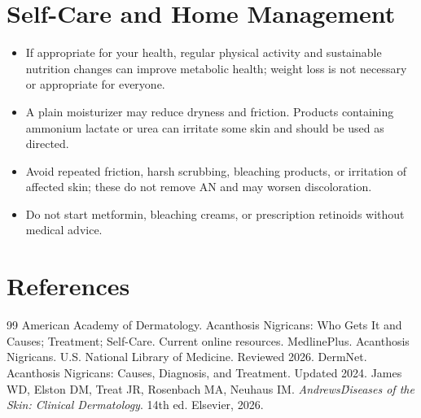 \section*{Self-Care and Home Management}
\begin{itemize}
 \item If appropriate for your health, regular physical activity and sustainable nutrition changes can improve metabolic health; weight loss is not necessary or appropriate for everyone.
 \item A plain moisturizer may reduce dryness and friction. Products containing ammonium lactate or urea can irritate some skin and should be used as directed.
 \item Avoid repeated friction, harsh scrubbing, bleaching products, or irritation of affected skin; these do not remove AN and may worsen discoloration.
 \item Do not start metformin, bleaching creams, or prescription retinoids without medical advice.
\end{itemize}

\section*{References}
\begin{thebibliography}{99}
 American Academy of Dermatology. Acanthosis Nigricans: Who Gets It and Causes; Treatment; Self-Care. Current online resources.
 MedlinePlus. Acanthosis Nigricans. U.S. National Library of Medicine. Reviewed 2026.
 DermNet. Acanthosis Nigricans: Causes, Diagnosis, and Treatment. Updated 2024.
 James WD, Elston DM, Treat JR, Rosenbach MA, Neuhaus IM. \textit{Andrews\' Diseases of the Skin: Clinical Dermatology}. 14th ed. Elsevier, 2026.
\end{thebibliography}
